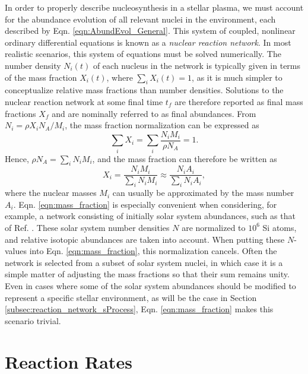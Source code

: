 In order to properly describe nucleosynthesis in a stellar plasma, we must account for the abundance evolution of all relevant nuclei in the environment, each described by Eqn. \ref{eqn:AbundEvol_General}. This system of coupled, nonlinear ordinary differential equations is known as a \emph{nuclear reaction network}. In most realistic scenarios, this system of equations must be solved numerically. The number density $N_{i}(t)$ of each nucleus in the network is typically given in terms of the mass fraction $X_{i}(t)$, where $\sum_{i} X_{i}(t) = 1$, as it is much simpler to conceptualize relative mass fractions than number densities. Solutions to the nuclear reaction network at some final time $t_{f}$ are therefore reported as final mass fractions $X_{f}$ and are nominally referred to as final abundances. From $N_{i} = \rho X_{i} N_{A} / M_{i}$, the mass fraction normalization can be expressed as
\begin{equation}
\sum_{i} X_{i} = \sum_{i} \frac{N_{i}M_{i}}{\rho N_{A}} = 1.
\end{equation}
Hence, $\rho N_{A} = \sum_{i} N_{i}M_{i}$, and the mass fraction can therefore be written as
\begin{equation} \label{eqn:mass_fraction}
X_{i} = \frac{N_{i}M_{i}}{\sum_{i} N_{i}M_{i}} \approx \frac{N_{i}A_{i}}{\sum_{i} N_{i}A_{i}},
\end{equation}
where the nuclear masses $M_{i}$ can usually be approximated by the mass number $A_{i}$. Eqn. \ref{eqn:mass_fraction} is especially convenient when considering, for example, a network consisting of initially solar system abundances, such as that of Ref. \cite{Lodders2009}. These solar system number densities $N$ are normalized to $10^{6}$ Si atoms, and relative isotopic abundances are taken into account. When putting these $N$-values into Eqn. \ref{eqn:mass_fraction}, this normalization cancels. Often the network is selected from a subset of solar system nuclei, in which case it is a simple matter of adjusting the mass fractions so that their sum remains unity. Even in cases where some of the solar system abundances should be modified to represent a specific stellar environment, as will be the case in Section \ref{subsec:reaction_network_sProcess}, Eqn. \ref{eqn:mass_fraction} makes this scenario trivial.


\section{Reaction Rates} \label{sec:rates}

